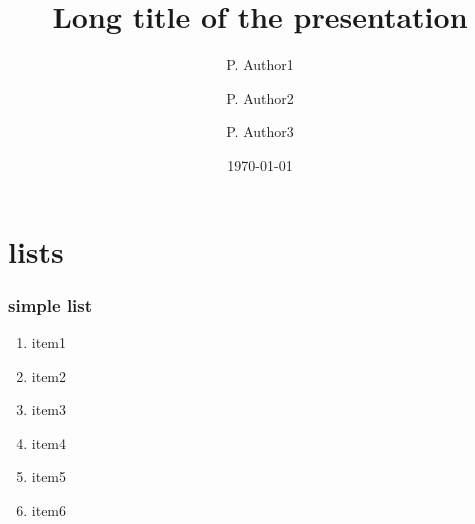 \documentclass{beamer}
\begin{document}

\title[Short presentation title]{Long title of the presentation}

\author[lecturer, maybe place and date]{P. Author1 \and
  P. Author2 \and P. Author3}


\date{\today}

% 
\begin{frame}
  \titlepage

  \acknowledgement
\end{frame}

% 
\section{lists}

\begin{frame}
  \tableofcontents
\end{frame}

% 
\begin{frame}
  \tableofcontents[currentsection]
\end{frame}

% 
\begin{frame}
\frametitle{simple list}
\begin{enumerate}
\item item1
\item item2
\item item3
\item item4
\item item5
\item item6
\end{enumerate}
\end{frame}
\end{document}
